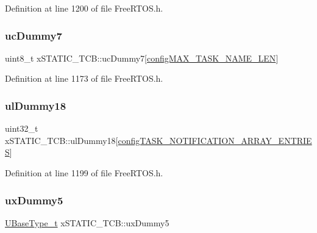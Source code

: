Definition at line 1200 of file Free\+R\+T\+O\+S.\+h.

\mbox{\label{structx_s_t_a_t_i_c___t_c_b_a308771ccd6723cad777695d84a0a2a30}} 
\subsubsection{\texorpdfstring{uc\+Dummy7}{ucDummy7}}
{\footnotesize\ttfamily uint8\+\_\+t x\+S\+T\+A\+T\+I\+C\+\_\+\+T\+C\+B\+::uc\+Dummy7\mbox{[}\hyperlink{vendor_2ceedling_2plugins_2freertos_2vendor_2freertos_2include_2_free_r_t_o_s_8h_ac388dc4041aab6997348828eb27fc1a8}{config\+M\+A\+X\+\_\+\+T\+A\+S\+K\+\_\+\+N\+A\+M\+E\+\_\+\+L\+EN}\mbox{]}}



Definition at line 1173 of file Free\+R\+T\+O\+S.\+h.

\mbox{\label{structx_s_t_a_t_i_c___t_c_b_a09231b4c92acd645dc72d7de8adfee3d}} 
\subsubsection{\texorpdfstring{ul\+Dummy18}{ulDummy18}}
{\footnotesize\ttfamily uint32\+\_\+t x\+S\+T\+A\+T\+I\+C\+\_\+\+T\+C\+B\+::ul\+Dummy18\mbox{[}\hyperlink{externals_2freertos_2include_2_free_r_t_o_s_8h_a5413143d3773c8e31f305805f4cad871}{config\+T\+A\+S\+K\+\_\+\+N\+O\+T\+I\+F\+I\+C\+A\+T\+I\+O\+N\+\_\+\+A\+R\+R\+A\+Y\+\_\+\+E\+N\+T\+R\+I\+ES}\mbox{]}}



Definition at line 1199 of file Free\+R\+T\+O\+S.\+h.

\mbox{\label{structx_s_t_a_t_i_c___t_c_b_ab950bb498901ef7291e49086e5a2efd0}} 
\subsubsection{\texorpdfstring{ux\+Dummy5}{uxDummy5}}
{\footnotesize\ttfamily \hyperlink{externals_2freertos_2portable_2_g_c_c_2_a_r_m___c_m0_2portmacro_8h_a646f89d4298e4f5afd522202b11cb2e6}{U\+Base\+Type\+\_\+t} x\+S\+T\+A\+T\+I\+C\+\_\+\+T\+C\+B\+::ux\+Dummy5}



